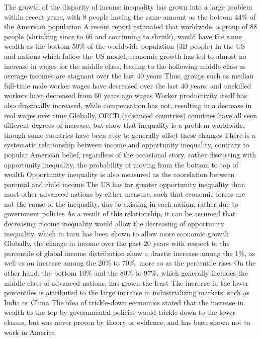 \documentclass[11 pt, twoside]{article}
\newenvironment{outline*}
{
	\begin{outline}[enumerate]
	}
	{\end{outline}
}
\begin{document}
\begin{outline*}
\1 The growth of the disparity of income inequality has grown into a large problem within recent years, with 8 people having the same amount as the bottom 44\% of the American population
\2 A recent report estimated that worldwide, a group of 88 people (shrinking since to 66 and continuing to shrink), would have the same wealth as the bottom 50\% of the worldwide population (3B people)
\2 In the US and nations which follow the US model, economic growth has led to almost no increase in wages for the middle class, leading to the hollowing middle class as average incomes are stagnant over the last 40 years
\3 Thus, groups such as median full-time male worker wages have decreased over the last 40 years, and unskilled workers have decreased from 60 years ago wages
\2 Worker productivity itself has also drastically increased, while compensation has not, resulting in a decrease in real wages over time
\2 Globally, OECD (advanced countries) countries have all seen different degrees of increase, but show that inequality is a problem worldwide, though some countries have been able to generally offset these changes
\1 There is a systematic relationship between income and opportunity inequality, contrary to popular American belief, regardless of the occasional story, rather discussing with opportunity inequality, the probability of moving from the bottom to top of wealth
\2 Opportunity inequality is also measured as the coorelation between parental and child income
\2 The US has far greater opportunity inequality than most other advanced nations by either measure, such that economic forces are not the cause of the inequality, due to existing in each nation, rather due to government policies
\1 As a result of this relationship, it can be assumed that decreasing income inequality would allow the decreasing of opportunity inequality, which in turn has been shown to allow more economic growth
\1 Globally, the change in income over the past 20 years with respect to the percentile of global income distribution show a drastic increase among the 1\%, as well as an increase among the 20\% to 70\%, more so as the percentile rises
\2 On the other hand, the bottom 10\% and the 80\% to 97\%, which generally includes the middle class of advanced nations, has grown the least
\2 The increase in the lower percentiles is attributed to the large increase in industrializing markets, such as India or China
\1 The idea of trickle-down economics stated that the increase in wealth to the top by governmental policies would trickle-down to the lower classes, but was never proven by theory or evidence, and has been shown not to work in America

\end{outline*}
\end{document}
